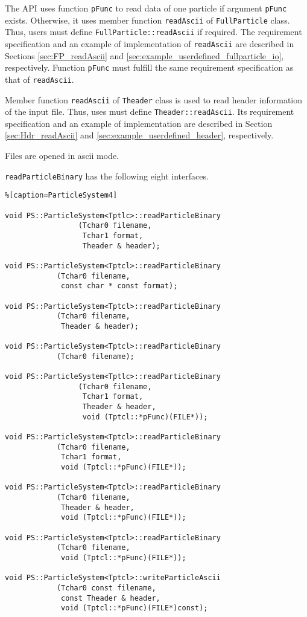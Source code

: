 \begin{itemize}
The API uses function \texttt{pFunc} to read data of one particle if argument \texttt{pFunc} exists. Otherwise, it uses member function \texttt{readAscii} of \texttt{FullParticle} class. Thus, users must define \texttt{FullParticle::readAscii} if required. The requirement specification and an example of implementation of \texttt{readAscii} are described in Sections \ref{sec:FP_readAscii} and  \ref{sec:example_userdefined_fullparticle_io}, respectively. Function \texttt{pFunc} must fulfill the same requirement specification as that of \texttt{readAscii}.

Member function \texttt{readAscii} of \texttt{Theader} class is used to read header information of the input file. Thus, uses must define \texttt{Theader::readAscii}. Its requirement specification and an example of implementation are described in Section \ref{sec:Hdr_readAscii} and \ref{sec:example_userdefined_header}, respectively.

Files are opened in ascii mode.

\end{itemize}


\label{sec:readParticleBinary}

\texttt{readParticleBinary} has the following eight interfaces.
\begin{lstlisting}%[caption=ParticleSystem4]

void PS::ParticleSystem<Tptlc>::readParticleBinary
                 (Tchar0 filename,
                  Tchar1 format,
                  Theader & header);

void PS::ParticleSystem<Tptcl>::readParticleBinary
            (Tchar0 filename,
             const char * const format); 
             
void PS::ParticleSystem<Tptcl>::readParticleBinary
            (Tchar0 filename,
             Theader & header);

void PS::ParticleSystem<Tptcl>::readParticleBinary
            (Tchar0 filename);

void PS::ParticleSystem<Tptlc>::readParticleBinary
                 (Tchar0 filename,
                  Tchar1 format,
                  Theader & header,
                  void (Tptcl::*pFunc)(FILE*));
                 
void PS::ParticleSystem<Tptcl>::readParticleBinary
            (Tchar0 filename,
             Tchar1 format,
             void (Tptcl::*pFunc)(FILE*));

void PS::ParticleSystem<Tptcl>::readParticleBinary
            (Tchar0 filename,
             Theader & header,
             void (Tptcl::*pFunc)(FILE*));
             
void PS::ParticleSystem<Tptcl>::readParticleBinary
            (Tchar0 filename,
             void (Tptcl::*pFunc)(FILE*));

void PS::ParticleSystem<Tptcl>::writeParticleAscii
            (Tchar0 const filename,
             const Theader & header,
             void (Tptcl::*pFunc)(FILE*)const);

\end{lstlisting}

